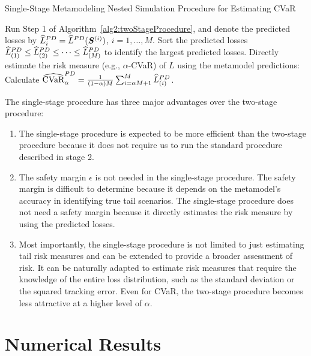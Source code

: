 \begin{algorithm}
\caption{Single-Stage Metamodeling Nested Simulation Procedure for Estimating CVaR}
\begin{algorithmic}[1] \label{alg2:oneStageProcedure}
    \STATE Run Step 1 of Algorithm~\ref{alg2:twoStageProcedure}, and denote the predicted losses by
    $\widehat{L}^{PD}_i = \widehat{L}^{PD}(\bm{S}^{(i)})$, $i=1,\ldots,M$.
    \STATE Sort the predicted losses $\widehat{L}^{PD}_{(1)}\leq \widehat{L}^{PD}_{(2)} \leq \cdots\leq \widehat{L}^{PD}_{(M)}$ to identify the largest predicted losses. 
    \STATE Directly estimate the risk measure (e.g., $\alpha$-CVaR) of $L$ using the metamodel predictions: Calculate $\widehat{\mbox{CVaR}}^{PD}_\alpha = \frac{1}{(1-\alpha)M} \sum_{i=\alpha M + 1}^{M}\widehat{L}^{PD}_{(i)}$.
\end{algorithmic}
\end{algorithm}

The single-stage procedure has three major advantages over the two-stage procedure:
\begin{enumerate}
    \item The single-stage procedure is expected to be more efficient than the two-stage procedure because it does not require us to run the standard procedure described in stage 2.
    \item The safety margin $\epsilon$ is not needed in the single-stage procedure.
    The safety margin is difficult to determine because it depends on the metamodel's accuracy in identifying true tail scenarios.
    The single-stage procedure does not need a safety margin because it directly estimates the risk measure by using the predicted losses.
    \item Most importantly, the single-stage procedure is not limited to just estimating tail risk measures and can be extended to provide a broader assessment of risk. 
    It can be naturally adapted to estimate risk measures that require the knowledge of the entire loss distribution, such as the standard deviation or the squared tracking error.
    Even for CVaR, the two-stage procedure becomes less attractive at a higher level of $\alpha$.
\end{enumerate}

\section{Numerical Results} \label{sec2:numerical}

